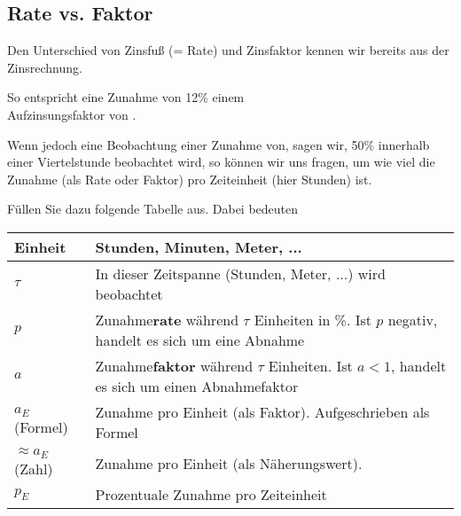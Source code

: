 \subsection{Rate vs. Faktor}

Den Unterschied von Zinsfuß (= Rate) und Zinsfaktor kennen wir bereits aus der Zinsrechnung.

So entspricht eine Zunahme von 12\% einem\\
Aufzinsungsfaktor von .

Wenn jedoch eine Beobachtung einer Zunahme von, sagen wir, 50\% innerhalb einer Viertelstunde beobachtet wird, so können wir uns fragen, um wie viel die Zunahme (als Rate oder Faktor) pro Zeiteinheit (hier Stunden) ist.


Füllen Sie dazu folgende Tabelle aus. Dabei bedeuten

\begin{tabular}{lp{14cm}}\hline
  Einheit & Stunden, Minuten, Meter, ... \\\hline
  $\tau$  & In dieser Zeitspanne (Stunden, Meter, ...) wird beobachtet \\\hline
  $p$     & Zunahme\textbf{rate}\index{Zunahmerate}\index{Rate} während $\tau$ Einheiten in \%. Ist $p$ negativ, handelt es sich um eine Abnahme\\\hline
  $a$     & Zunahme\textbf{faktor}\index{Zunahmefaktor} während $\tau$ Einheiten. Ist $a<1$, handelt es sich um einen Abnahmefaktor\\\hline
  $a_E$ (Formel)   & Zunahme pro Einheit (als Faktor). Aufgeschrieben als Formel\\\hline
  $\approx a_E$ (Zahl)  & Zunahme pro Einheit (als Näherungswert).\\\hline
  $p_E$   & Prozentuale Zunahme pro Zeiteinheit\\\hline
  \end{tabular} 

\leserluft{}
\leserluft{}
\newcommand{\ph}[1]{\noTRAINER{...........}\TRAINER{#1}}

\renewcommand{\arraystretch}{1.7}

